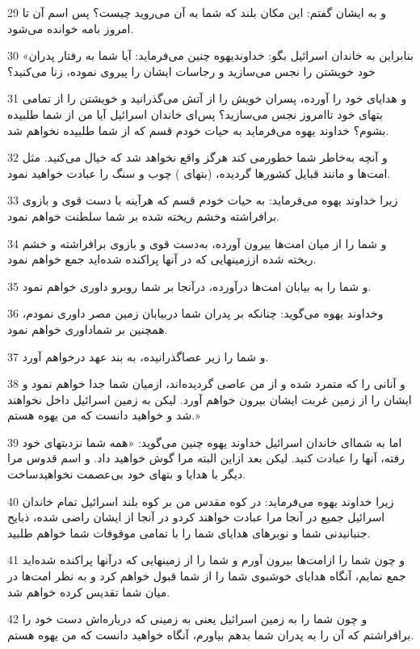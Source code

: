 \par 29 و به ایشان گفتم: این مکان بلند که شما به آن می‌روید چیست؟ پس اسم آن تا امروز بامه خوانده می‌شود.
\par 30 «بنابراین به خاندان اسرائیل بگو: خداوندیهوه چنین می‌فرماید: آیا شما به رفتار پدران خود خویشتن را نجس می‌سازید و رجاسات ایشان را پیروی نموده، زنا می‌کنید؟
\par 31 و هدایای خود را آورده، پسران خویش را از آتش می‌گذرانید و خویشتن را از تمامی بتهای خود تاامروز نجس می‌سازید؟ پس‌ای خاندان اسرائیل آیا من از شما طلبیده بشوم؟ خداوند یهوه می‌فرماید به حیات خودم قسم که از شما طلبیده نخواهم شد.
\par 32 و آنچه به‌خاطر شما خطورمی کند هرگز واقع نخواهد شد که خیال می‌کنید. مثل امت‌ها و مانند قبایل کشورها گردیده، (بتهای ) چوب و سنگ را عبادت خواهید نمود.
\par 33 زیرا خداوند یهوه می‌فرماید: به حیات خودم قسم که هرآینه با دست قوی و بازوی برافراشته وخشم ریخته شده بر شما سلطنت خواهم نمود.
\par 34 و شما را از میان امت‌ها بیرون آورده، به‌دست قوی و بازوی برافراشته و خشم ریخته شده اززمینهایی که در آنها پراکنده شده‌اید جمع خواهم نمود.
\par 35 و شما را به بیابان امت‌ها در‌آورده، درآنجا بر شما روبرو داوری خواهم نمود.
\par 36 وخداوند یهوه می‌گوید: چنانکه بر پدران شما دربیابان زمین مصر داوری نمودم، همچنین بر شماداوری خواهم نمود.
\par 37 و شما را زیر عصاگذرانیده، به بند عهد درخواهم آورد.
\par 38 و آنانی را که متمرد شده و از من عاصی گردیده‌اند، ازمیان شما جدا خواهم نمود و ایشان را از زمین غربت ایشان بیرون خواهم آورد. لیکن به زمین اسرائیل داخل نخواهند شد و خواهید دانست که من یهوه هستم.»
\par 39 اما به شما‌ای خاندان اسرائیل خداوند یهوه چنین می‌گوید: «همه شما نزدبتهای خود رفته، آنها را عبادت کنید. لیکن بعد ازاین البته مرا گوش خواهید داد. و اسم قدوس مرا دیگر با هدایا و بتهای خود بی‌عصمت نخواهیدساخت.
\par 40 زیرا خداوند یهوه می‌فرماید: در کوه مقدس من بر کوه بلند اسرائیل تمام خاندان اسرائیل جمیع در آنجا مرا عبادت خواهند کردو در آنجا از ایشان راضی شده، ذبایح جنبانیدنی شما و نوبرهای هدایای شما را با تمامی موقوفات شما خواهم طلبید.
\par 41 و چون شما را ازامت‌ها بیرون آورم و شما را از زمینهایی که درآنها پراکنده شده‌اید جمع نمایم، آنگاه هدایای خوشبوی شما را از شما قبول خواهم کرد و به نظر امت‌ها در میان شما تقدیس کرده خواهم شد.
\par 42 و چون شما را به زمین اسرائیل یعنی به زمینی که درباره‌اش دست خود را برافراشتم که آن را به پدران شما بدهم بیاورم، آنگاه خواهید دانست که من یهوه هستم.
